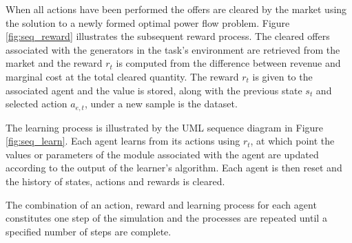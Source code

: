 
When all actions have been performed the offers are cleared by the market using
the solution to a newly formed optimal power flow problem.  Figure
\ref{fig:seq_reward} illustrates the subsequent reward process.  The cleared
offers associated with the generators in the task's environment are retrieved
from the market and the reward $r_t$ is computed from the difference between
revenue and marginal cost at the total cleared quantity.
The reward $r_t$ is given to the associated agent and the value is stored, along
with the previous state $s_t$ and selected action $a_{e,t}$, under a new sample
is the dataset.


The learning process is illustrated by the UML sequence diagram in Figure
\ref{fig:seq_learn}.  Each agent learns from its actions using $r_t$, at which
point the values or parameters of the module associated with the agent are
updated according to the output of the learner's algorithm.  Each agent is then
reset and the history of states, actions and rewards is cleared.

The combination of an action, reward and learning process for each agent
constitutes one step of the simulation and the processes are repeated until a
specified number of steps are complete.


